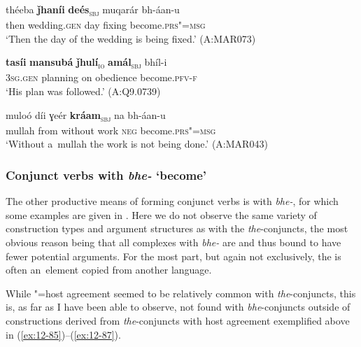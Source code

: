 \begin{exe}
\begin{exe}
\ex
\label{ex:12-85}
\gll théeba {\ob}\textbf{ǰhaníi} \textbf{deés}{\cb}\textsubscript{\textsc{\upshape sbj}} muqarár bh-áan-u\\
then wedding.\textsc{gen} day fixing become.\textsc{prs"=msg} \\
\glt `Then the day of the wedding is being fixed.' (A:MAR073)
\end{exe}
\begin{exe}
\ex
\label{ex:12-86}
\gll {\ob}\textbf{tasíi} \textbf{mansubá} \textbf{ǰhulí}{\cb}\textsubscript{\textsc{\upshape io}} {\ob}\textbf{amál}{\cb}\textsubscript{\textsc{\upshape sbj}} bhíl-i\\
\textsc{3sg.gen} planning on obedience become.\textsc{pfv-f}\\
\glt `His plan was followed.' (A:Q9.0739)
\end{exe}
\begin{exe}
\ex
\label{ex:12-87}
\gll muloó díi ɣeér {\ob}\textbf{kráam}{\cb}\textsubscript{\textsc{\upshape sbj}} na bh-áan-u\\
mullah from without work \textsc{neg} become.\textsc{prs"=msg}\\
\glt `Without a~mullah the work is not being done.' (A:MAR043)
\end{exe}

\subsubsection*{Conjunct verbs with \textit{bhe-} `become'}

The other productive means of forming conjunct verbs is with \textit{bhe-}, for which some examples are given in . Here we do not observe the same variety of construction types and argument structures as with the \textit{the}-conjuncts, the most obvious reason being that all complexes with \textit{bhe-} are  and thus bound to have fewer potential arguments. For the most part, but again not exclusively, the  is often an~element copied from another language. 


While "=host agreement seemed to be relatively common with \textit{the}-conjuncts, this is, as far as I have been able to observe, not found with \textit{bhe}-conjuncts outside of  constructions derived from \textit{the}-conjuncts with host agreement exemplified above in (\ref{ex:12-85})--(\ref{ex:12-87}). 



\end{exe}
